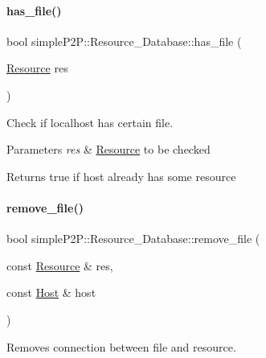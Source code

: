 \paragraph{\texorpdfstring{has\+\_\+file()}{has\_file()}}
{\footnotesize\ttfamily bool simple\+P2\+P\+::\+Resource\+\_\+\+Database\+::has\+\_\+file (\begin{DoxyParamCaption}\item[{\hyperlink{classsimpleP2P_1_1Resource}{Resource}}]{res }\end{DoxyParamCaption})}



Check if localhost has certain file. 


\begin{DoxyParams}{Parameters}
{\em res} & \hyperlink{classsimpleP2P_1_1Resource}{Resource} to be checked \\
\hline
\end{DoxyParams}
\begin{DoxyReturn}{Returns}
true if host already has some resource 
\end{DoxyReturn}
\mbox{\label{classsimpleP2P_1_1Resource__Database_a9b0fe1012eba333db6d8e99b02764d4d}} 
\paragraph{\texorpdfstring{remove\+\_\+file()}{remove\_file()}\hspace{0.1cm}{\footnotesize\ttfamily [1/2]}}
{\footnotesize\ttfamily bool simple\+P2\+P\+::\+Resource\+\_\+\+Database\+::remove\+\_\+file (\begin{DoxyParamCaption}\item[{const \hyperlink{classsimpleP2P_1_1Resource}{Resource} \&}]{res,  }\item[{const \hyperlink{classsimpleP2P_1_1Host}{Host} \&}]{host }\end{DoxyParamCaption})}



Removes connection between file and resource. 


